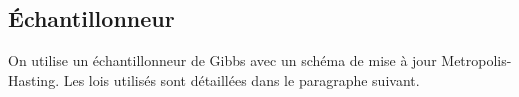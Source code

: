 \subsection{Échantillonneur}
On utilise un échantillonneur de Gibbs avec un schéma de mise à jour Metropolis-Hasting.
Les lois utilisés sont détaillées dans le paragraphe suivant.